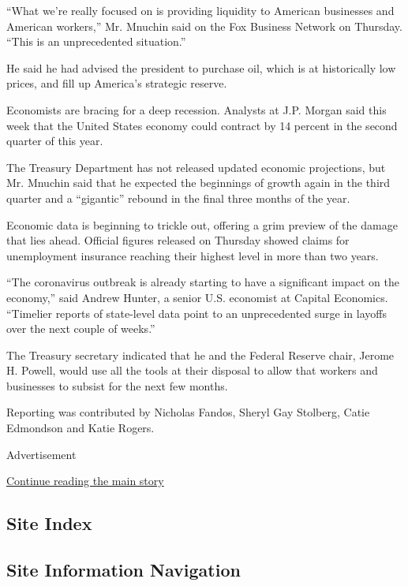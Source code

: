 ``What we're really focused on is providing liquidity to American
businesses and American workers,'' Mr. Mnuchin said on the Fox Business
Network on Thursday. ``This is an unprecedented situation.''

He said he had advised the president to purchase oil, which is at
historically low prices, and fill up America's strategic reserve.

Economists are bracing for a deep recession. Analysts at J.P. Morgan
said this week that the United States economy could contract by 14
percent in the second quarter of this year.

The Treasury Department has not released updated economic projections,
but Mr. Mnuchin said that he expected the beginnings of growth again in
the third quarter and a ``gigantic'' rebound in the final three months
of the year.

Economic data is beginning to trickle out, offering a grim preview of
the damage that lies ahead. Official figures released on Thursday showed
claims for unemployment insurance reaching their highest level in more
than two years.

``The coronavirus outbreak is already starting to have a significant
impact on the economy,'' said Andrew Hunter, a senior U.S. economist at
Capital Economics. ``Timelier reports of state-level data point to an
unprecedented surge in layoffs over the next couple of weeks.''

The Treasury secretary indicated that he and the Federal Reserve chair,
Jerome H. Powell, would use all the tools at their disposal to allow
that workers and businesses to subsist for the next few months.

Reporting was contributed by Nicholas Fandos, Sheryl Gay Stolberg, Catie
Edmondson and Katie Rogers.

Advertisement

\protect\hyperlink{after-bottom}{Continue reading the main story}

\hypertarget{site-index}{%
\subsection{Site Index}\label{site-index}}

\hypertarget{site-information-navigation}{%
\subsection{Site Information
Navigation}\label{site-information-navigation}}

